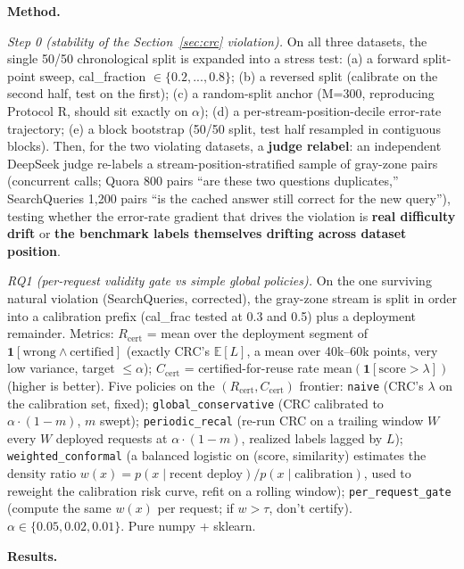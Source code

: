 \documentclass[11pt]{article}
\begin{document}
\textbf{Method.}

\emph{Step 0 (stability of the Section~\ref{sec:crc} violation).} On all three datasets, the single 50/50 chronological split is expanded into a stress test: (a) a forward split-point sweep, cal\_fraction $\in \{0.2, ..., 0.8\}$; (b) a reversed split (calibrate on the second half, test on the first); (c) a random-split anchor (M=300, reproducing Protocol R, should sit exactly on $\alpha$); (d) a per-stream-position-decile error-rate trajectory; (e) a block bootstrap (50/50 split, test half resampled in contiguous blocks). Then, for the two violating datasets, a \textbf{judge relabel}: an independent DeepSeek judge re-labels a stream-position-stratified sample of gray-zone pairs (concurrent calls; Quora 800 pairs ``are these two questions duplicates,'' SearchQueries 1{,}200 pairs ``is the cached answer still correct for the new query''), testing whether the error-rate gradient that drives the violation is \textbf{real difficulty drift} or \textbf{the benchmark labels themselves drifting across dataset position}.

\emph{RQ1 (per-request validity gate vs simple global policies).} On the one surviving natural violation (SearchQueries, corrected), the gray-zone stream is split in order into a calibration prefix (cal\_frac tested at 0.3 and 0.5) plus a deployment remainder. Metrics: $R_\text{cert}$ = mean over the deployment segment of $\mathbf{1}[\text{wrong} \wedge \text{certified}]$ (exactly CRC's $\mathbb{E}[L]$, a mean over 40k--60k points, very low variance, target $\le \alpha$); $C_\text{cert}$ = certified-for-reuse rate $\mathrm{mean}(\mathbf{1}[\text{score} > \lambda])$ (higher is better). Five policies on the $(R_\text{cert}, C_\text{cert})$ frontier: \texttt{naive} (CRC's $\lambda$ on the calibration set, fixed); \texttt{global\_\allowbreak{}conservative} (CRC calibrated to $\alpha \cdot (1-m)$, $m$ swept); \texttt{periodic\_\allowbreak{}recal} (re-run CRC on a trailing window $W$ every $W$ deployed requests at $\alpha \cdot (1-m)$, realized labels lagged by $L$); \texttt{weighted\_\allowbreak{}conformal} (a balanced logistic on (score, similarity) estimates the density ratio $w(x) = p(x \mid \text{recent deploy}) / p(x \mid \text{calibration})$, used to reweight the calibration risk curve, refit on a rolling window); \texttt{per\_\allowbreak{}request\_\allowbreak{}gate} (compute the same $w(x)$ per request; if $w > \tau$, don't certify). $\alpha \in \{0.05, 0.02, 0.01\}$. Pure numpy + sklearn.

\textbf{Results.}
\end{document}
